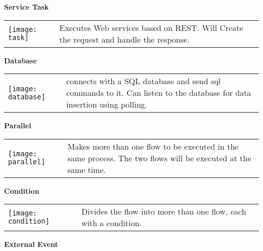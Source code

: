 \par\vspace {1cm}

\large \textbf{Service Task}\\

\begin{tabular}{C{2.2cm}  L{10cm}}
    \texttt{[image: task]} & Executes Web services based on REST.
    \linebreak Will Create the request and handle the response.

\end{tabular}

\par\vspace {1cm}

\large \textbf{Database}\\

\begin{tabular}{C{2.2cm}  L{10cm}}
    \texttt{[image: database]} & connects with a SQL database and send sql commands to it.
    \linebreak Can listen to the database for data insertion using polling.

\end{tabular}

\par\vspace {1cm}

\large \textbf{Parallel}\\

\begin{tabular}{C{2.2cm}  L{10cm}}
    \texttt{[image: parallel]} & Makes more than one flow to be executed in the same process.
    \linebreak The two flows will be executed at the same time.

\end{tabular}

\par\vspace {1cm}

\large \textbf{Condition}\\

\begin{tabular}{C{2.2cm}  L{10cm}}
    \texttt{[image: condition]} & Divides the flow into more than one flow, each with a condition.
    
\end{tabular}

\par\vspace {1cm}

\large \textbf{External Event}\\

